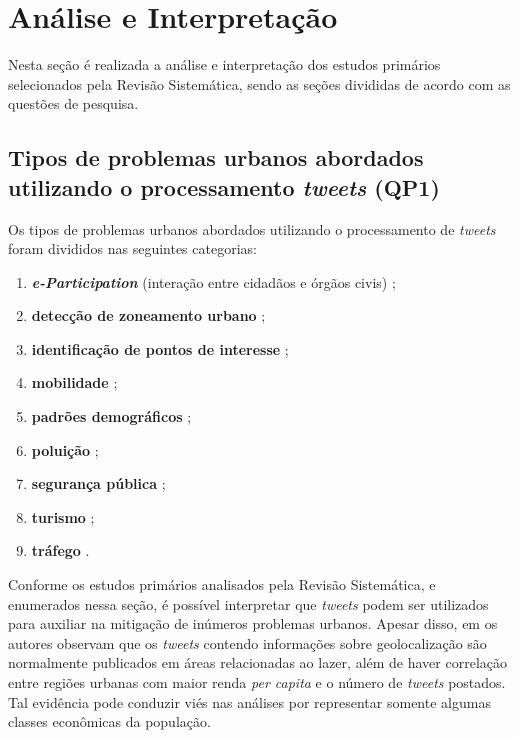 \documentclass[
	12pt,				%
	oneside,			%
	a4paper,			%
	english,			%
	brazil				%
	]{abntex2ppgsi}
\begin{document}
{{{\section{Análise e Interpretação}
\label{analise}
Nesta seção é realizada a análise e interpretação dos estudos primários selecionados pela Revisão Sistemática, sendo as seções divididas de acordo com as questões de pesquisa.
\subsection{Tipos de problemas urbanos abordados utilizando o processamento \textit{tweets} (QP1)}

Os tipos de problemas urbanos abordados utilizando o processamento de \textit{tweets} foram divididos nas seguintes categorias: 

\begin{enumerate}
\item \textit{\textbf{e-Participation}} (interação entre  cidadãos  e órgãos civis) \cite{Mukherjee2015, Soomro2016};
\item \textbf{detecção de zoneamento urbano} \cite{Frias-Martinez2014};
\item \textbf{identificação de pontos de interesse} \cite{Farseev2015, Gutev2016, Bendler2014, Abbasi2015, Gkiotsalitis2015, Gkiotsalitis2016, Hasan2014, Maghrebi2015, DiLorenzo2013};
\item \textbf{mobilidade} \cite{Gutev2016, Chen2016, Yousaf2014};
\item \textbf{padrões demográficos} \cite{Farseev2015, Gutev2016, Steiger2015Census, Guo2016};
\item \textbf{poluição} \cite{Zagal2016};
\item \textbf{segurança pública} \cite{Wen2016, Mata2015};
\item \textbf{turismo} \cite{Thomaz2016, Abbasi2015, Chua2016, Sobolevsky2015};
\item \textbf{tráfego} \cite{Anantharam2015, Lecue2014}.
\end{enumerate}

Conforme os estudos primários analisados pela Revisão Sistemática, e enumerados nessa seção, é possível interpretar que \textit{tweets} podem ser utilizados para auxiliar na mitigação de inúmeros problemas urbanos. Apesar disso, em \cite{Chaniotakis2015} os autores observam que os \textit{tweets} contendo informações sobre geolocalização são normalmente publicados em áreas relacionadas ao lazer, além de haver correlação entre regiões urbanas com maior renda \textit{per capita} e o número de \textit{tweets} postados. Tal evidência pode conduzir viés nas análises por representar somente algumas classes econômicas da população. 

}}}
\end{document}
